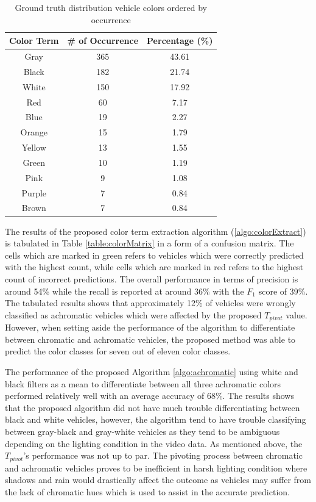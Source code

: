 \begin{table}[bht!]
\centering
\caption{Ground truth distribution vehicle colors ordered by occurrence}
\label{table:colorDist}
\begin{tabular}{ccc}
\toprule
Color Term & \# of Occurrence & Percentage (\%)   \\
\midrule
Gray       & 365       & 43.61  \\
Black      & 182       & 21.74  \\
White      & 150       & 17.92  \\
Red        & 60        & 7.17   \\
Blue       & 19        & 2.27   \\
Orange     & 15        & 1.79   \\
Yellow     & 13        & 1.55   \\
Green      & 10        & 1.19   \\
Pink       & 9         & 1.08   \\
Purple     & 7         & 0.84   \\
Brown      & 7         & 0.84   \\
\bottomrule
\end{tabular}
\end{table}




The results of the proposed color term extraction algorithm (\ref{algo:colorExtract}) is tabulated in Table \ref{table:colorMatrix} in a form of a confusion matrix. The cells which are marked in green refers to vehicles which were correctly predicted with the highest count, while cells which are marked in red refers to the highest count of incorrect predictions. The overall performance in terms of precision is around 54\% while the recall is reported at around 36\% with the $F_1$ score of 39\%. The tabulated results shows that approximately 12\% of vehicles were wrongly classified as achromatic vehicles which were affected by the proposed $T_{pivot}$ value. However, when setting aside the performance of the algorithm to differentiate between chromatic and achromatic vehicles, the proposed method was able to predict the color classes for seven out of eleven color classes. 

The performance of the proposed Algorithm \ref{algo:achromatic} using white and black filters as a mean to differentiate between all three achromatic colors performed relatively well with an average accuracy of 68\%. The results shows that the proposed algorithm did not have much trouble differentiating between black and white vehicles, however, the algorithm tend to have trouble classifying between gray-black and gray-white vehicles as they tend to be ambiguous depending on the lighting condition in the video data. As mentioned above, the $T_{pivot}$'s performance was not up to par. The pivoting process between chromatic and achromatic vehicles proves to be inefficient in harsh lighting condition where shadows and rain would drastically affect the outcome as vehicles may suffer from the lack of chromatic hues which is used to assist in the accurate prediction.

